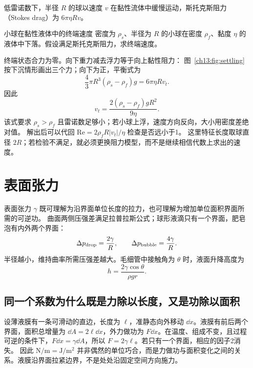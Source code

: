 低雷诺数下，半径 $R$ 的球以速度 $v$ 在黏性流体中缓慢运动，斯托克斯阻力（Stokes drag）为 $6\pi\eta Rv$。

\begin{origexamplebox}{小球在黏性液体中的终端速度}\label{ch13:ex:settling}
密度为 $\rho_s$、半径为 $R$ 的小球在密度 $\rho_f$、黏度 $\eta$ 的液体中下落。假设满足斯托克斯阻力，求终端速度。

\ThQSettling
\end{origexamplebox}
\begin{xesolution}
终端状态合力为零。向下重力减去浮力等于向上黏性阻力：
\FluidSettlingDiagram
图~\ref{ch13:fig:settling}按下沉情形画出三个力；向下为正，平衡式为
\[
 \frac43\pi R^3(\rho_s-\rho_f)g=6\pi\eta Rv_t.
\]
因此
\[
 \boxed{v_t=\frac{2(\rho_s-\rho_f)gR^2}{9\eta}}.
\]
该式要求 $\rho_s>\rho_f$ 且雷诺数足够小；若小球上浮，速度方向反向，大小用密度差绝对值。
解出后可以代回 $\mathrm{Re}=2\rho_fR|v_t|/\eta$ 检查是否远小于1。
这里特征长度取球直径 $2R$；若检验不满足，就必须更换阻力模型，而不是继续相信代数上求出的速度。
\end{xesolution}

\section{表面张力}\label{ch13:sec:surface}

表面张力 $\gamma$ 既可理解为沿界面单位长度的拉力，也可理解为增加单位面积界面所需的可逆功。
曲面两侧压强差满足拉普拉斯公式；球形液滴只有一个界面，肥皂泡有内外两个界面：
\begin{equation}
 \Delta p_{\rm drop}=\frac{2\gamma}{R},\qquad
 \Delta p_{\rm bubble}=\frac{4\gamma}{R}.
\end{equation}
半径越小，维持曲率所需压强差越大。毛细管中接触角为 $\theta$ 时，液面升降高度为
\begin{equation}
 h=\frac{2\gamma\cos\theta}{\rho gr}.
\end{equation}

\subsection{同一个系数为什么既是力除以长度，又是功除以面积}
设薄液膜有一条可滑动的直边，长度为 $\ell$，准静态向外移动 $\dd x$。液膜有前后两个界面，面积总增量为 $\dd A=2\ell\dd x$，外力做功为 $F\dd x$。在温度、组成不变，且过程可逆的条件下，$F\dd x=\gamma\dd A$，所以 $F=2\gamma\ell$。若只有一个界面，相应的因子2消失。
因此 $\mathrm{N/m}=\mathrm{J/m^2}$ 并非偶然的单位巧合，而是力做功与面积变化之间的关系。液膜沿界面拉紧边界，不是处处沿固定空间方向施力。

